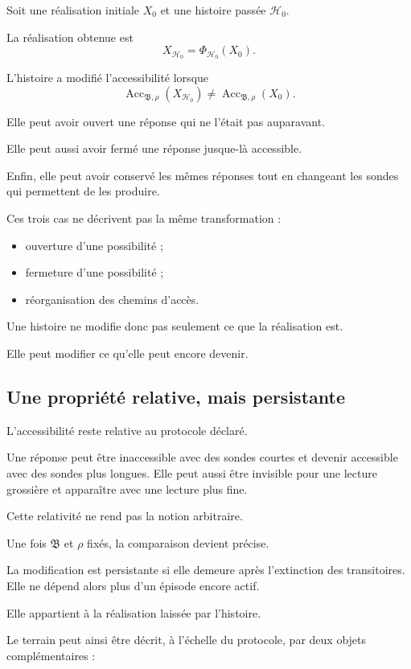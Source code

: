 Soit une réalisation initiale $X_0$ et une histoire passée
$\mathcal H_0$.

La réalisation obtenue est
\[
X_{\mathcal H_0}
=
\Phi_{\mathcal H_0}(X_0).
\]

L'histoire a modifié l'accessibilité lorsque
\[
\operatorname{Acc}_{\mathfrak B,\rho}(X_{\mathcal H_0})
\neq
\operatorname{Acc}_{\mathfrak B,\rho}(X_0).
\]

Elle peut avoir ouvert une réponse qui ne l'était pas auparavant.

Elle peut aussi avoir fermé une réponse jusque-là accessible.

Enfin, elle peut avoir conservé les mêmes réponses tout en changeant les sondes qui permettent de les produire.

Ces trois cas ne décrivent pas la même transformation :

\begin{itemize}
\tightlist
\item
  ouverture d'une possibilité ;
\item
  fermeture d'une possibilité ;
\item
  réorganisation des chemins d'accès.
\end{itemize}

Une histoire ne modifie donc pas seulement ce que la réalisation est.

Elle peut modifier ce qu'elle peut encore devenir.

\subsection{Une propriété relative, mais persistante}

L'accessibilité reste relative au protocole déclaré.

Une réponse peut être inaccessible avec des sondes courtes et devenir accessible avec des sondes plus longues. Elle peut aussi être invisible pour une lecture grossière et apparaître avec une lecture plus fine.

Cette relativité ne rend pas la notion arbitraire.

Une fois $\mathfrak B$ et $\rho$ fixés, la comparaison devient précise.

La modification est persistante si elle demeure après l'extinction des transitoires. Elle ne dépend alors plus d'un épisode encore actif.

Elle appartient à la réalisation laissée par l'histoire.

Le terrain peut ainsi être décrit, à l'échelle du protocole, par deux objets complémentaires :

